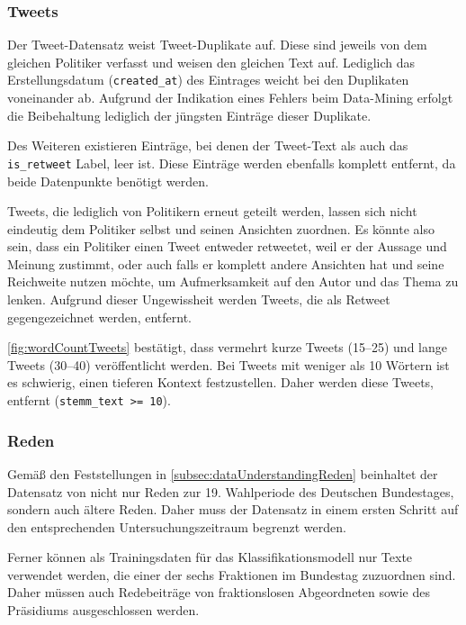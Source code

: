 \subsubsection*{Tweets} \label{subsubsec:filteringTweets}

Der Tweet-Datensatz \textcite{saltzer_finding_2022} weist Tweet-Duplikate auf. Diese sind jeweils von dem gleichen Politiker verfasst und weisen den gleichen Text auf. Lediglich das Erstellungsdatum (\texttt{created\_at}) des Eintrages weicht bei den Duplikaten voneinander ab. Aufgrund der Indikation eines Fehlers beim Data-Mining erfolgt die Beibehaltung lediglich der jüngsten Einträge dieser Duplikate.

Des Weiteren existieren Einträge, bei denen der Tweet-Text als auch das \texttt{is\_retweet} Label, leer ist. Diese Einträge werden ebenfalls komplett entfernt, da beide Datenpunkte benötigt werden. 

Tweets, die lediglich von Politikern erneut geteilt werden, lassen sich nicht eindeutig dem Politiker selbst und seinen Ansichten zuordnen. Es könnte also sein, dass ein Politiker einen Tweet entweder retweetet, weil er der Aussage und Meinung zustimmt, oder auch falls er komplett andere Ansichten hat und seine Reichweite nutzen möchte, um Aufmerksamkeit auf den Autor und das Thema zu lenken. Aufgrund dieser Ungewissheit werden Tweets, die als Retweet gegengezeichnet werden, entfernt.

\autoref{fig:wordCountTweets} bestätigt, dass vermehrt kurze Tweets (\numrange{15}{25}) und lange Tweets (\numrange{30}{40}) veröffentlicht werden. Bei Tweets mit weniger als \num{10} Wörtern ist es schwierig, einen tieferen Kontext festzustellen. Daher werden diese Tweets, entfernt (\texttt{stemm\_text >= 10}).

\subsubsection*{Reden}

Gemäß den Feststellungen in \autoref{subsec:dataUnderstandingReden} beinhaltet der Datensatz von \citeauthor{richter_open_2021} nicht nur Reden zur 19. Wahlperiode des Deutschen Bundestages, sondern auch ältere Reden. Daher muss der Datensatz in einem ersten Schritt auf den entsprechenden Untersuchungszeitraum begrenzt werden.

Ferner können als Trainingsdaten für das Klassifikationsmodell nur Texte verwendet werden, die einer der sechs Fraktionen im Bundestag zuzuordnen sind. Daher müssen auch Redebeiträge von fraktionslosen Abgeordneten sowie des Präsidiums ausgeschlossen werden.

